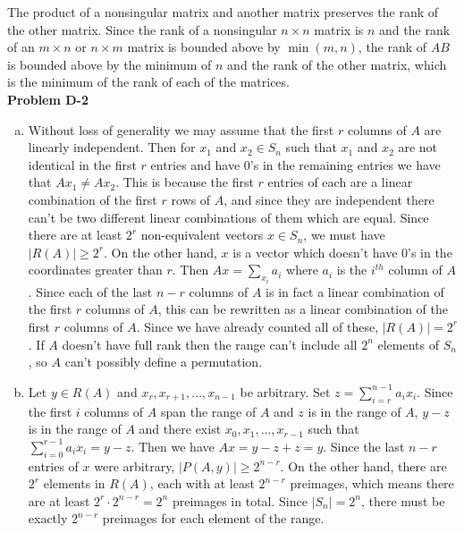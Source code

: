 \documentclass{article}
\begin{document}
The product of a nonsingular matrix and another matrix preserves the rank of the other matrix.  Since the rank of a nonsingular $n \times n$ matrix is $n$ and the rank of an $m \times n$ or $n \times m$ matrix is bounded above by $\min(m,n)$, the rank of $AB$ is bounded above by the minimum of $n$ and the rank of the other matrix, which is the minimum of the rank of each of the matrices.  \\

\noindent\textbf{Problem D-2}\\

\begin{enumerate}[a.]
\item Without loss of generality we may assume that the first $r$ columns of $A$ are linearly independent.  Then for $x_1$ and $x_2 \in S_n$ such that $x_1$ and $x_2$ are not identical in the first $r$ entries and have 0's in the remaining entries we have that $Ax_1 \neq Ax_2$.  This is because the first $r$ entries of each are a linear combination of the first $r$ rows of $A$, and since they are independent there can't be two different linear combinations of them which are equal.  Since there are at least $2^r$ non-equivalent vectors $x \in S_n$, we must have $|R(A)| \geq 2^r$.  On the other hand, $x$ is a vector which doesn't have 0's in the coordinates greater than $r$.  Then $Ax = \sum_{x_i}a_i$ where $a_i$ is the $i^{th}$ column of $A$.  Since each of the last $n - r$ columns of $A$ is in fact a linear combination of the first $r$ columns of $A$, this can be rewritten as a linear combination of the first $r$ columns of $A$.  Since we have already counted all of these, $|R(A)| = 2^r$.  If $A$ doesn't have full rank then the range can't include all $2^n$ elements of $S_n$, so $A$ can't possibly define a permutation.

\item Let $y \in R(A)$ and $x_r, x_{r+1}, \ldots, x_{n-1}$ be arbitrary.  Set $z = \sum_{i=r}^{n-1} a_ix_i$.  Since the first $i$ columns of $A$ span the range of $A$ and $z$ is in the range of $A$, $y-z$ is in the range of $A$ and there exist $x_0, x_1, \ldots, x_{r-1}$ such that $\sum_{i=0}^{r-1}a_ix_i = y-z$.  Then we have $Ax = y-z+z=y$.  Since the last $n-r$ entries of $x$ were arbitrary, $|P(A,y)| \geq 2^{n-r}$. On the other hand, there are $2^r$ elements in $R(A)$, each with at least $2^{n-r}$ preimages, which means there are at least $2^r \cdot 2^{n-r} = 2^n$ preimages in total.  Since $|S_n| = 2^n$, there must be exactly $2^{n-r}$ preimages for each element of the range. 


\end{enumerate}
\end{document}
